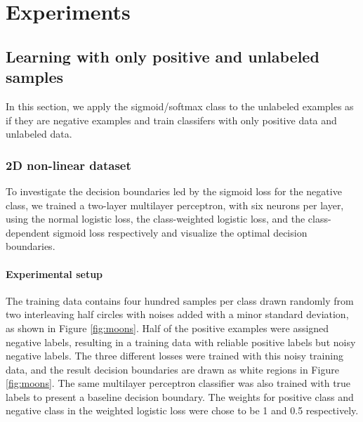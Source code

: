 \section{Experiments}
\label{sec:experiments}



\subsection{Learning with only positive and unlabeled samples}
\label{subsec:pulearning}

In this section, we apply the sigmoid/softmax class to the unlabeled examples as if they are negative examples and train classifers with only positive data and unlabeled data.

\subsubsection{2D non-linear dataset}

To investigate the decision boundaries led by the sigmoid loss for the negative class, we trained a two-layer multilayer perceptron, with six neurons per layer, using the normal logistic loss, the class-weighted logistic loss, and the class-dependent sigmoid loss respectively and visualize the optimal decision boundaries.

\paragraph{Experimental setup}
The training data contains four hundred samples per class drawn randomly from two interleaving half circles with noises added with a minor standard deviation, as shown in Figure \ref{fig:moons}.
Half of the positive examples were assigned negative labels, resulting in a training data with reliable positive labels but noisy negative labels.
The three different losses were trained with this noisy training data, and the result decision boundaries are drawn as white regions in Figure \ref{fig:moons}.
The same multilayer perceptron classifier was also trained with true labels to present a baseline decision boundary.
The weights for positive class and negative class in the weighted logistic loss were chose to be 1 and 0.5 respectively.

